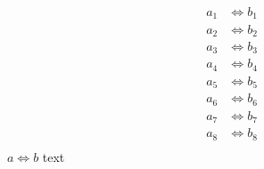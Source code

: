 \begin{align*}
	a_1 & \iff b_1 \\
	a_2 & \iff b_2 \\
	a_3 & \iff b_3 \\
	a_4 & \iff b_4 \\
	a_5 & \iff b_5 \\
	a_6 & \iff b_6 \\
	a_7 & \iff b_7 \\
	a_8 & \iff b_8 \\
\end{align*}
\ifdraft
	$a \iff b$
	text
\fi
